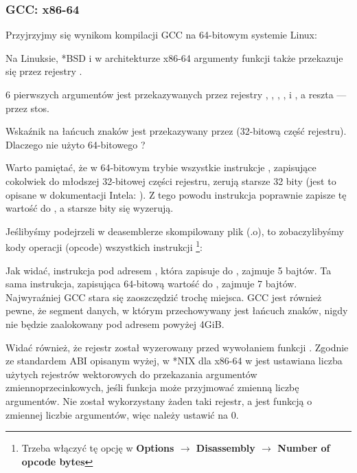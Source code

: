 \subsubsection{GCC: x86-64}

Przyjrzyjmy się wynikom kompilacji GCC na 64-bitowym systemie Linux:



Na Linuksie, *BSD i \MacOSX w architekturze x86-64 argumenty funkcji także przekazuje się przez rejestry \SysVABI.

6 pierwszych argumentów jest przekazywanych przez rejestry \RDI, \RSI, \RDX, \RCX,  i , a reszta --- przez stos.

Wskaźnik na łańcuch znaków jest przekazywany przez \EDI (32-bitową część rejestru). Dlaczego nie użyto 64-bitowego \RDI?

Warto pamiętać, że w 64-bitowym trybie wszystkie instrukcje \MOV, zapisujące cokolwiek do młodszej 32-bitowej części rejestru, zerują starsze 32 bity (jest to opisane w dokumentacji Intela: ).
Z tego powodu instrukcja  poprawnie zapisze tę wartość do \RAX, a starsze bity się wyzerują.

Jeślibyśmy podejrzeli w deasemblerze \IDA skompilowany plik (.o), to zobaczylibyśmy kody operacji (opcode) wszystkich instrukcji
\footnote{Trzeba włączyć tę opcję w \textbf{Options $\rightarrow$ Disassembly $\rightarrow$ Number of opcode bytes}}:



\label{hw_EDI_instead_of_RDI}
Jak widać, instrukcja \MOV pod adresem , która zapisuje do \EDI, zajmuje 5 bajtów.
Ta sama instrukcja, zapisująca 64-bitową wartość do \RDI, zajmuje 7 bajtów.
Najwyraźniej GCC stara się zaoszczędzić trochę miejsca.
GCC jest również pewne, że segment danych, w którym przechowywany jest łańcuch znaków, nigdy nie będzie zaalokowany pod adresem powyżej 4\gls{GiB}.

\label{SysVABI_input_EAX}
Widać również, że rejestr \EAX został wyzerowany przed wywołaniem funkcji \printf.
Zgodnie ze standardem \ac{ABI} opisanym wyżej, w *NIX dla x86-64 w \EAX jest ustawiana liczba użytych rejestrów wektorowych do przekazania argumentów zmiennoprzecinkowych, jeśli funkcja może przyjmować zmienną liczbę argumentów.
Nie został wykorzystany żaden taki rejestr, a \printf jest funkcją o zmiennej liczbie argumentów, więc należy ustawić \EAX na 0.
